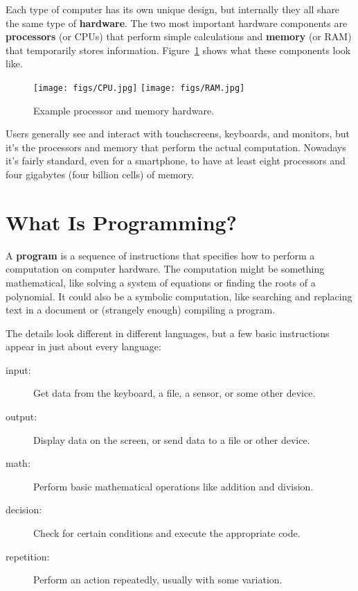 Each type of computer has its own unique design, but internally they all share the same type of {\bf hardware}.
The two most important hardware components are {\bf processors} (or CPUs) that perform simple calculations and {\bf memory} (or RAM) that temporarily stores information.
Figure~\ref{fig.cpuram} shows what these components look like.

\begin{figure}[!ht]
\begin{center}
\texttt{[image: figs/CPU.jpg]}
\hspace{2em}
\texttt{[image: figs/RAM.jpg]}
\caption{Example processor and memory hardware.}
\label{fig.cpuram}
\end{center}
\end{figure}

Users generally see and interact with touchscreens, keyboards, and monitors, but it's the processors and memory that perform the actual computation.
Nowadays it's fairly standard, even for a smartphone, to have at least eight processors and four gigabytes (four billion cells) of memory.


\section{What Is Programming?}
\label{computer-programming_what-is-programming}


A {\bf program} is a sequence of instructions that specifies how to perform a computation on computer hardware.
The computation might be something mathematical, like solving a system of equations or finding the roots of a polynomial.
It could also be a symbolic computation, like searching and replacing text in a document or (strangely enough) compiling a program.

The details look different in different languages, but a few basic instructions appear in just about every language:

\begin{description}
\item[input:] Get data from the keyboard, a file, a sensor, or some other device.
\item[output:] Display data on the screen, or send data to a file or other device.
\item[math:] Perform basic mathematical operations like addition and division.
\item[decision:] Check for certain conditions and execute the appropriate code.
\item[repetition:] Perform an action repeatedly, usually with some variation.
\end{description}

